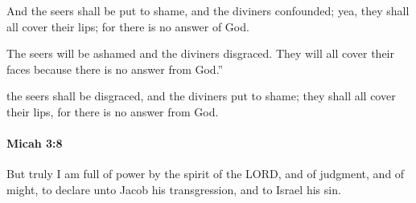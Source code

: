 			\begin{versebox}
					\item[BHS] 
					\item[LXX] 
					\item[ASV] And the seers shall be put to shame, and the diviners confounded; yea, they shall all cover their lips; for there is no answer of God.
					\item[NIV] The seers will be ashamed and the diviners disgraced. They will all cover their faces because there is no answer from God.”
					\item[NRSV] the seers shall be disgraced, and the diviners put to shame; they shall all cover their lips, for there is no answer from God.
			\end{versebox}

		\paragraph{Micah 3:8} %
			\label{MICAH-3-8}

			But truly I am full of power by the spirit of the LORD, and of judgment, and of might, to declare unto Jacob his transgression, and to Israel his sin.

